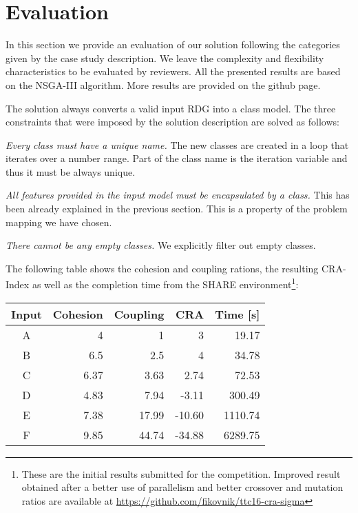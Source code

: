 
\section{Evaluation}
\label{sec:Evaluation}
\enlargethispage{10mm}

In this section we provide an evaluation of our solution following the categories given by the case study description.
We leave the complexity and flexibility characteristics to be evaluated by reviewers.
All the presented results are based on the NSGA-III algorithm. 
More results are provided on the github page.

The solution always converts a valid input RDG into a class model.
The three constraints that were imposed by the solution description are solved as follows:
%
\begin{compactitem}[---]
  \item \emph{Every class must have a unique name.} 
  The new classes are created in a loop that iterates over a number range.
  Part of the class name is the iteration variable and thus it must be always unique.
  \item \emph{All features provided in the input model must be encapsulated by a class.} 
  This has been already explained in the previous section.
  This is a property of the problem mapping we have chosen.
  \item \emph{There cannot be any empty classes.}
  We explicitly filter out empty classes.
\end{compactitem}

The following table shows the cohesion and coupling rations, the resulting CRA-Index as well as the completion time from the SHARE environment\footnote{These are the initial results submitted for the competition. Improved result obtained after a better use of parallelism and better crossover and mutation ratios are available at \url{https://github.com/fikovnik/ttc16-cra-sigma}}:
\begin{center}
\begin{tabular}{crrrr}
\hline
\textbf{Input} & \textbf{Cohesion} & \textbf{Coupling} & \textbf{CRA} & \textbf{Time {[}s{]}} \\ \hline
A           & 4        & 1        & 3       & 19.17    \\
B           & 6.5      & 2.5      & 4       & 34.78    \\
C           & 6.37     & 3.63     & 2.74    & 72.53    \\
D           & 4.83     & 7.94     & -3.11   & 300.49   \\
E           & 7.38     & 17.99    & -10.60  & 1110.74  \\
F           & 9.85     & 44.74    & -34.88  & 6289.75  \\ \hline
\end{tabular}
\end{center}
